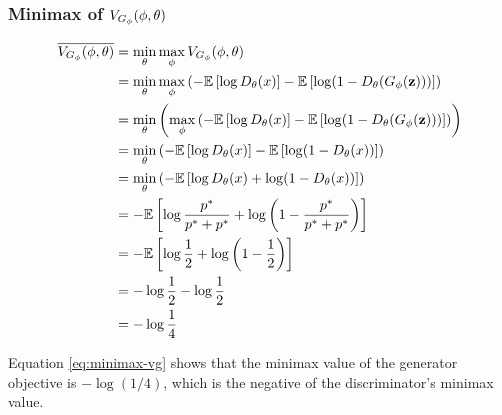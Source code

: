 \subsubsection{Minimax of $V_{G_\phi}(\phi, \theta)$}
\label{sec:minimax-vg}
\begin{align}
	\overline{V_{G_\phi}(\phi, \theta)} & = \min_{\theta}\max_{\phi} V_{G_\phi}(\phi, \theta) \nonumber        \\
	               & = \min_{\theta}\max_{\mathbf{\phi}}
	\left (-\mathbb{E}\left[\log{D_\theta(x)}\right] -
	\mathbb{E}\left[\log(1 -
	D_\theta(G_\phi(\mathbf{z})))\right] \right) \nonumber                     \\
	               & = \min_{\theta}\left(\max_{\mathbf{\phi}}
	\left (-\mathbb{E}\left[\log{D_\theta(x)}\right] -
		\mathbb{E}\left[\log(1 -
				D_\theta(G_\phi(\mathbf{z})))\right] \right)
	\right) \nonumber                                                \\
	               & = \min_{\theta}\left(
	-\mathbb{E}\left[\log{D_\theta(x)}\right] -
	\mathbb{E}\left[\log(1 -
	D_\theta(x))\right] \right) \nonumber                                  \\
	               & = \min_{\theta}\left(
	-\mathbb{E}\left[\log{D_\theta(x)} +
	\log(1 - D_\theta(x))\right] \right) \nonumber                         \\
	               & = -\mathbb{E}\left[\log{p^*\over p^*+ p^*} +
	\log\left(1 - {p^* \over p^* + p^*}\right)\right] \nonumber      \\
	               & = - \mathbb{E}\left[\log{1 \over 2} +
	\log{\left(1 - {1 \over 2}\right)}\right] \nonumber              \\
	               & = - \log{1 \over 2} - \log{1 \over 2} \nonumber \\
	               & = - \log{1 \over 4} \label{eq:minimax-vg}
\end{align}

Equation \ref{eq:minimax-vg} shows that the minimax value of the generator objective is $-\log(1/4)$, which is the negative of the discriminator's minimax value.

